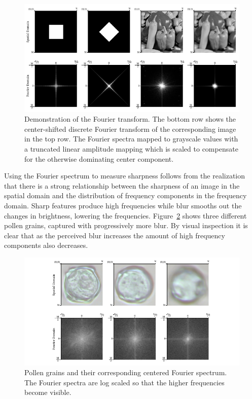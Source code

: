 \begin{figure}[htbp]
  \centering
  \includegraphics[width=\textwidth]{figs/method/fourier/fourier-examples.pdf}
  \caption[Demonstration of the Fourier transform]{
    Demonstration of the Fourier transform.
The bottom row shows the center-shifted discrete Fourier transform of the corresponding image in the top row.
The Fourier spectra mapped to grayscale values with a truncated linear amplitude mapping which is scaled to compensate for the otherwise dominating center component.}\label{fig:fourier-demo}
\end{figure}

Using the Fourier spectrum to measure sharpness follows from the realization that there is a strong relationship between the sharpness of an image in the spatial domain and the distribution of frequency components in the frequency domain.
Sharp features produce high frequencies while blur smooths out the changes in brightness, lowering the frequencies.
Figure~\ref{fig:fourier} shows three different pollen grains, captured with progressively more blur.
By visual inspection it is clear that as the perceived blur increases the amount of high frequency components also decreases.


\begin{figure}[htbp]
  \centering
  \includegraphics[width=\textwidth]{figs/method/fourier/fourier-pollen.pdf}
  \caption[Fourier spectrum]{Pollen grains and their corresponding centered Fourier spectrum.
The Fourier spectra are log scaled so that the higher frequencies become visible.}\label{fig:fourier}
\end{figure}

